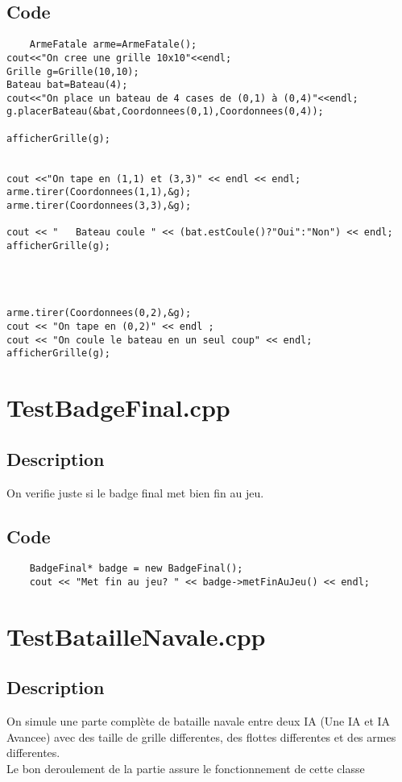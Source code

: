         \subsection{Code}
\begin{lstlisting}
	ArmeFatale arme=ArmeFatale();
cout<<"On cree une grille 10x10"<<endl;
Grille g=Grille(10,10);
Bateau bat=Bateau(4);
cout<<"On place un bateau de 4 cases de (0,1) à (0,4)"<<endl;
g.placerBateau(&bat,Coordonnees(0,1),Coordonnees(0,4));

afficherGrille(g);


cout <<"On tape en (1,1) et (3,3)" << endl << endl;
arme.tirer(Coordonnees(1,1),&g);
arme.tirer(Coordonnees(3,3),&g);

cout << "   Bateau coule " << (bat.estCoule()?"Oui":"Non") << endl;
afficherGrille(g);




arme.tirer(Coordonnees(0,2),&g);
cout << "On tape en (0,2)" << endl ; 
cout << "On coule le bateau en un seul coup" << endl;
afficherGrille(g);
	\end{lstlisting}
    \section{TestBadgeFinal.cpp}
        \subsection{Description}
            On verifie juste si le badge final met bien fin au jeu.
        \subsection{Code}
\begin{lstlisting}
	BadgeFinal* badge = new BadgeFinal();
	cout << "Met fin au jeu? " << badge->metFinAuJeu() << endl;
	\end{lstlisting}
    \section{TestBatailleNavale.cpp}
        \subsection{Description}
            On simule une parte complète de bataille navale entre deux IA (Une IA et IA Avancee) avec des taille de grille differentes, des flottes differentes et des armes differentes.\\
            Le bon deroulement de la partie assure le fonctionnement de cette classe
